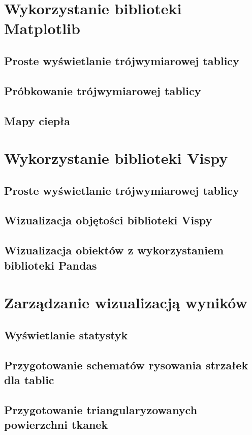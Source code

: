 \section{Wykorzystanie biblioteki Matplotlib}
\subsection{Proste wyświetlanie trójwymiarowej tablicy}
\subsection{Próbkowanie trójwymiarowej tablicy}
\subsection{Mapy ciepła}

\section{Wykorzystanie biblioteki Vispy}
\subsection{Proste wyświetlanie trójwymiarowej tablicy}
\subsection{Wizualizacja objętości biblioteki Vispy}
\subsection{Wizualizacja obiektów z wykorzystaniem biblioteki Pandas}

\section{Zarządzanie wizualizacją wyników}
\subsection{Wyświetlanie statystyk}
\subsection{Przygotowanie schematów rysowania strzałek dla tablic}
\subsection{Przygotowanie triangularyzowanych powierzchni tkanek}
